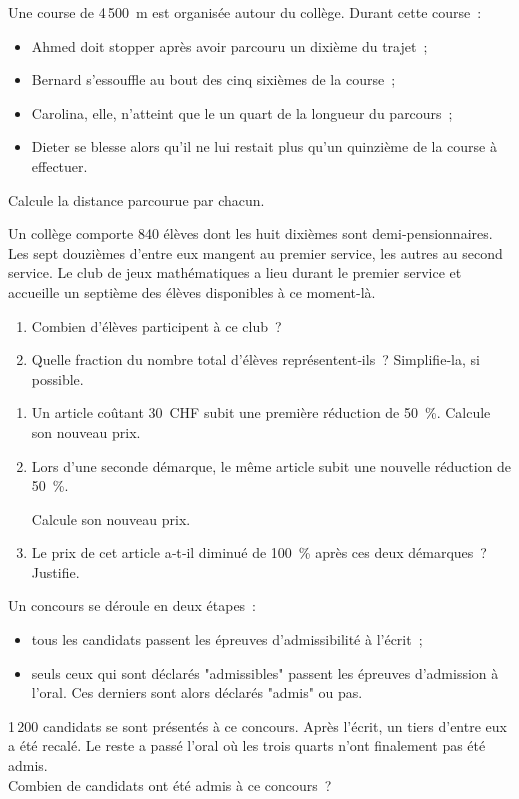 \begin{exercice}[La course]
Une course de 4\,500 m est organisée autour du collège. Durant cette course :
\begin{itemize}
 \item Ahmed doit stopper après avoir parcouru un dixième du trajet ;
 \item Bernard s'essouffle au bout des cinq sixièmes de la course ;
 \item Carolina, elle, n'atteint que le un quart de la longueur du parcours ;
 \item Dieter se blesse alors qu'il ne lui restait plus qu'un quinzième de la course à effectuer.
 \end{itemize}
Calcule la distance parcourue par chacun.
\end{exercice}


\begin{exercice}
Un collège comporte 840 élèves dont les huit dixièmes sont demi‑pensionnaires. \\[0.5em]
Les sept douzièmes d'entre eux mangent au premier service, les autres au second service. Le club de jeux mathématiques a lieu durant le premier service et accueille un septième des élèves disponibles à ce moment-là.
\begin{enumerate}
 \item Combien d'élèves participent à ce club ?
 \item Quelle fraction du nombre total d'élèves représentent‑ils ? Simplifie‑la, si possible.
 \end{enumerate}
\end{exercice}


\begin{exercice}
\begin{enumerate}
 \item Un article coûtant 30 CHF subit une première réduction de 50 \%. Calcule son nouveau prix.
 \item Lors d'une seconde démarque, le même article subit une nouvelle réduction de 50 \%.
 
Calcule son nouveau prix.
 \item Le prix de cet article a‑t‑il diminué de 100 \% après ces deux démarques ? Justifie.
 \end{enumerate}
\end{exercice}


\begin{exercice}[Le concours]
Un concours se déroule en deux étapes : 
\begin{itemize}
 \item tous les candidats passent les épreuves d'admissibilité à l'écrit ;
 \item seuls ceux qui sont déclarés "admissibles" passent les épreuves d'admission à l'oral. Ces derniers sont alors déclarés "admis" ou pas.
 \end{itemize}
1\,200 candidats se sont présentés à ce concours. Après l'écrit, un tiers d'entre eux a été recalé. Le reste a passé l'oral où les trois quarts n'ont finalement pas été admis. \\[0.5em]
Combien de candidats ont été admis à ce concours ?
\end{exercice}


